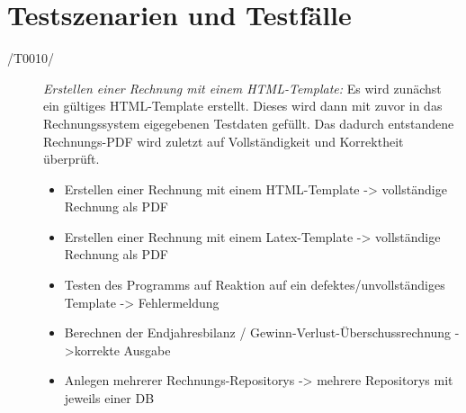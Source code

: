 
\section{Testszenarien und Testf\"alle}



\begin{description}
  \item[/T0010/]
    \textit{Erstellen einer Rechnung mit einem HTML-Template:}
   Es wird zun\"achst ein g\"ultiges HTML-Template erstellt. Dieses wird dann mit zuvor in das Rechnungssystem eigegebenen Testdaten gef\"ullt. Das dadurch entstandene Rechnungs-PDF wird zuletzt auf Vollst\"andigkeit und Korrektheit \"uberpr\"uft.
	\begin{itemize}
   		\item Erstellen einer Rechnung mit einem HTML-Template -> vollständige Rechnung als PDF
		\item Erstellen einer Rechnung mit einem Latex-Template -> vollständige Rechnung als PDF
		\item Testen des Programms auf Reaktion auf ein defektes/unvollständiges Template -> Fehlermeldung
		\item Berechnen der Endjahresbilanz / Gewinn-Verlust-Überschussrechnung ->korrekte Ausgabe
		\item Anlegen mehrerer Rechnungs-Repositorys -> mehrere Repositorys mit jeweils einer DB
   \end{itemize}
\end{description}


